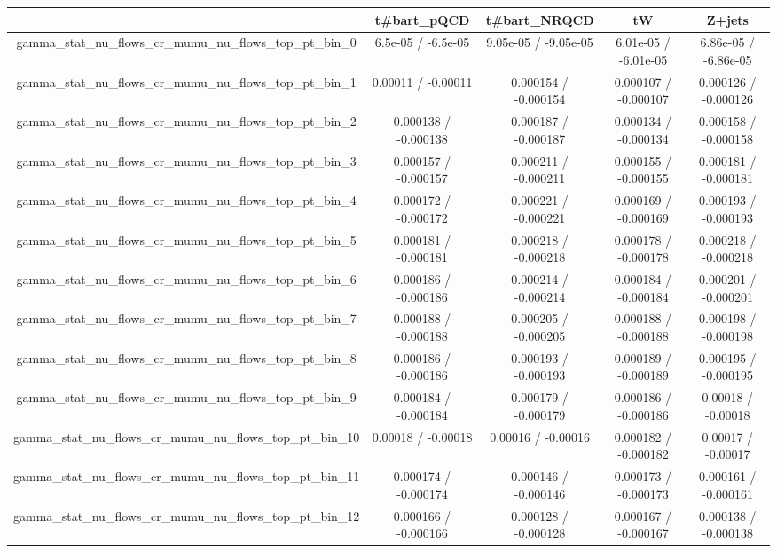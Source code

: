 \documentclass[10pt]{article}
\begin{document}
\begin{table}[htbp]
\begin{center}
\begin{tabular}{|c|c|c|c|c|}
\hline 
      & t#bar{t}_{pQCD}      & t#bar{t}_{NRQCD}      & tW      & Z+jets \\ 
\hline 
  gamma_stat_nu_flows_cr_mumu_nu_flows_top_pt_bin_0 & 6.5e-05 / -6.5e-05 & 9.05e-05 / -9.05e-05 & 6.01e-05 / -6.01e-05 & 6.86e-05 / -6.86e-05 \\ 
  gamma_stat_nu_flows_cr_mumu_nu_flows_top_pt_bin_1 & 0.00011 / -0.00011 & 0.000154 / -0.000154 & 0.000107 / -0.000107 & 0.000126 / -0.000126 \\ 
  gamma_stat_nu_flows_cr_mumu_nu_flows_top_pt_bin_2 & 0.000138 / -0.000138 & 0.000187 / -0.000187 & 0.000134 / -0.000134 & 0.000158 / -0.000158 \\ 
  gamma_stat_nu_flows_cr_mumu_nu_flows_top_pt_bin_3 & 0.000157 / -0.000157 & 0.000211 / -0.000211 & 0.000155 / -0.000155 & 0.000181 / -0.000181 \\ 
  gamma_stat_nu_flows_cr_mumu_nu_flows_top_pt_bin_4 & 0.000172 / -0.000172 & 0.000221 / -0.000221 & 0.000169 / -0.000169 & 0.000193 / -0.000193 \\ 
  gamma_stat_nu_flows_cr_mumu_nu_flows_top_pt_bin_5 & 0.000181 / -0.000181 & 0.000218 / -0.000218 & 0.000178 / -0.000178 & 0.000218 / -0.000218 \\ 
  gamma_stat_nu_flows_cr_mumu_nu_flows_top_pt_bin_6 & 0.000186 / -0.000186 & 0.000214 / -0.000214 & 0.000184 / -0.000184 & 0.000201 / -0.000201 \\ 
  gamma_stat_nu_flows_cr_mumu_nu_flows_top_pt_bin_7 & 0.000188 / -0.000188 & 0.000205 / -0.000205 & 0.000188 / -0.000188 & 0.000198 / -0.000198 \\ 
  gamma_stat_nu_flows_cr_mumu_nu_flows_top_pt_bin_8 & 0.000186 / -0.000186 & 0.000193 / -0.000193 & 0.000189 / -0.000189 & 0.000195 / -0.000195 \\ 
  gamma_stat_nu_flows_cr_mumu_nu_flows_top_pt_bin_9 & 0.000184 / -0.000184 & 0.000179 / -0.000179 & 0.000186 / -0.000186 & 0.00018 / -0.00018 \\ 
  gamma_stat_nu_flows_cr_mumu_nu_flows_top_pt_bin_10 & 0.00018 / -0.00018 & 0.00016 / -0.00016 & 0.000182 / -0.000182 & 0.00017 / -0.00017 \\ 
  gamma_stat_nu_flows_cr_mumu_nu_flows_top_pt_bin_11 & 0.000174 / -0.000174 & 0.000146 / -0.000146 & 0.000173 / -0.000173 & 0.000161 / -0.000161 \\ 
  gamma_stat_nu_flows_cr_mumu_nu_flows_top_pt_bin_12 & 0.000166 / -0.000166 & 0.000128 / -0.000128 & 0.000167 / -0.000167 & 0.000138 / -0.000138 \\ 

\end{tabular}
\end{center}
\end{table}
\end{document}
